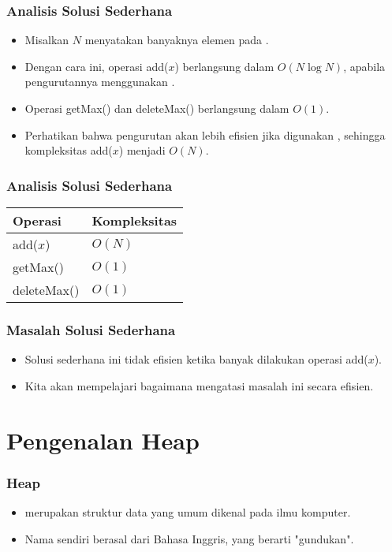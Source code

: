 \begin{frame}
\frametitle{Analisis Solusi Sederhana}
\begin{itemize}
  \item Misalkan $N$ menyatakan banyaknya elemen pada \farray.
  \item Dengan cara ini, operasi add($x$) berlangsung dalam $O(N \log{N})$, apabila pengurutannya menggunakan .
  \item Operasi getMax() dan deleteMax() berlangsung dalam $O(1)$.
  \newline
  \item Perhatikan bahwa pengurutan akan lebih efisien jika digunakan , sehingga kompleksitas add($x$) menjadi $O(N)$.
\end{itemize}
\end{frame}

\begin{frame}
\frametitle{Analisis Solusi Sederhana}
\begin{table}[ht]
  \begin{tabular}{|l|l|}
    \hline Operasi  & Kompleksitas\\
    \hline  add($x$) & $O(N)$  \\
    \hline  getMax() & $O(1)$ \\
    \hline  deleteMax() & $O(1)$ \\
    \hline
  \end{tabular}
\end{table}  
\end{frame}

\begin{frame}
\frametitle{Masalah Solusi Sederhana}
\begin{itemize}
  \item Solusi sederhana ini tidak efisien ketika banyak dilakukan operasi add($x$).
  \item Kita akan mempelajari bagaimana \pheap mengatasi masalah ini secara efisien.
\end{itemize}
\end{frame}

\section{Pengenalan Heap}
\frame{\sectionpage}

\begin{frame}
\frametitle{Heap}
\begin{itemize}
  \item \pHeap merupakan struktur data yang umum dikenal pada ilmu komputer.
  \item Nama \pheap sendiri berasal dari Bahasa Inggris, yang berarti "gundukan". 
\end{itemize}
\end{frame}

